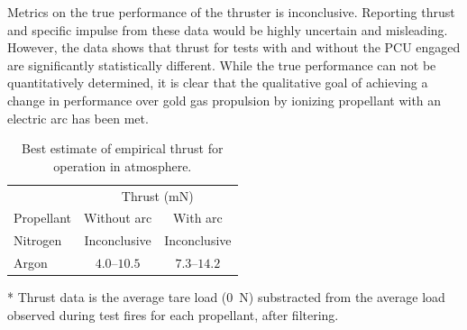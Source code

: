 \documentclass[journal]{IEEEtran}
\begin{document}
Metrics on the true performance of the thruster is inconclusive.
Reporting thrust and specific impulse from these data would be highly uncertain and misleading.
However, the data shows that thrust for tests with and without the PCU engaged are significantly statistically different.
While the true performance can not be quantitatively determined, it is clear that the qualitative goal of achieving a change in performance over gold gas propulsion by ionizing propellant with an electric arc has been met.

\begin{table}
  \begin{threeparttable}
  \caption{Best estimate of empirical thrust for operation in atmosphere.
\label{tab:empirical-performance}
}
  \begin{tabular}{lcc}
    \toprule
    & \multicolumn{2}{c}{Thrust (\si{\milli\newton})\tnote{*}} \\
    Propellant & Without arc & With arc \\
    \midrule
    Nitrogen & Inconclusive & Inconclusive \\
    Argon    & $4.0$--$10.5$ & $7.3$--$14.2$\\
    \bottomrule
  \end{tabular}
  \begin{tablenotes}
  \item[*] Thrust data is the {\color{red}average tare load (\SI{0}{\newton})} substracted from the average load observed during test fires for each propellant, after filtering.
  \end{tablenotes}
\end{threeparttable}
\end{table}


\end{document}
